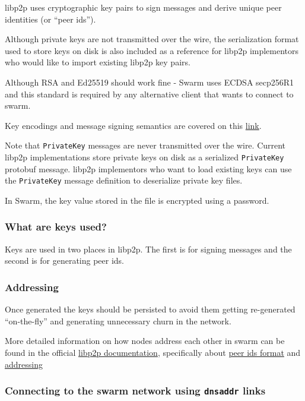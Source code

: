 libp2p uses cryptographic key pairs to sign messages and derive unique peer identities (or ``peer ids'').

Although private keys are not transmitted over the wire, the serialization format used to store keys on disk is also included as a reference for libp2p implementors who would like to import existing libp2p key pairs.

Although RSA and Ed25519 should work fine - Swarm uses ECDSA secp256R1 and this standard is required by any alternative client that wants to connect to swarm.

Key encodings and message signing semantics are covered on this \href{https://github.com/libp2p/specs/blob/master/peer-ids/peer-ids.md\#keys}{link}.

Note that \texttt{PrivateKey} messages are never transmitted over the wire. Current libp2p implementations store private keys on disk as a serialized \texttt{PrivateKey} protobuf message. libp2p implementors who want to load existing keys can use the \texttt{PrivateKey} message
definition to deserialize private key files.

In Swarm, the key value stored in the file is encrypted using a password.

\subsubsection{What are keys used? \statusyellow}\label{sec:underlay-transport} 

Keys are used in two places in libp2p. The first is for signing messages and the second is for generating peer ids.

\subsubsection{Addressing \statusyellow}\label{sec:underlay-transport} 

Once generated the keys should be persisted to avoid them getting re-generated ``on-the-fly'' and generating unnecessary churn in the network.

More detailed information on how nodes address each other in swarm can be found in the official \href{https://docs.libp2p.io/}{libp2p documentation}, specifically about \href{https://github.com/libp2p/specs/blob/master/peer-ids/peer-ids.md\#peer-ids}{peer ids format} and \href{https://github.com/libp2p/specs/tree/master/addressing}{addressing}

\subsubsection{Connecting to the swarm network using \lstinline{dnsaddr} links}\label{sec:dnsaddr} 

